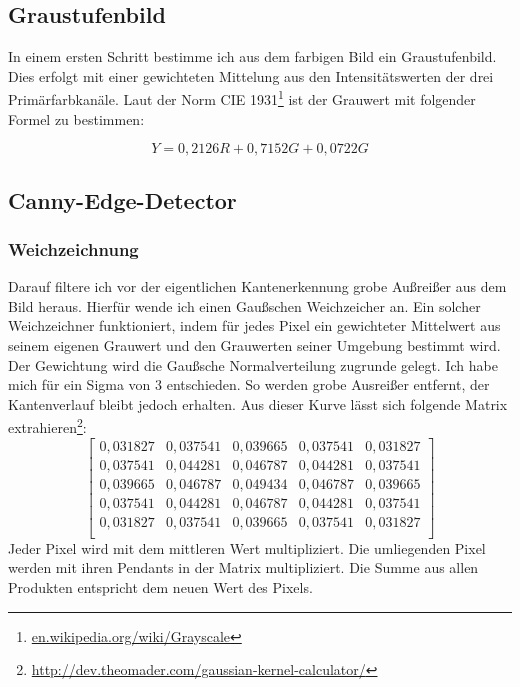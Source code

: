 \subsection{Graustufenbild}
In einem ersten Schritt bestimme ich aus dem farbigen Bild ein Graustufenbild. Dies erfolgt mit einer gewichteten Mittelung aus den Intensitätswerten der drei Primärfarbkanäle. Laut der Norm CIE 1931\footnote{\url{en.wikipedia.org/wiki/Grayscale}} ist der Grauwert mit folgender Formel zu bestimmen:

\begin{equation}
Y = 0,2126R+0,7152G+0,0722G
\end{equation}

\subsection{Canny-Edge-Detector}
\subsubsection{Weichzeichnung}
Darauf filtere ich vor der eigentlichen Kantenerkennung grobe Außreißer aus dem Bild heraus. Hierfür wende ich einen Gaußschen Weichzeicher an. Ein solcher Weichzeichner funktioniert, indem für jedes Pixel ein gewichteter Mittelwert aus seinem eigenen Grauwert und den Grauwerten seiner Umgebung bestimmt wird. Der Gewichtung wird die Gaußsche Normalverteilung zugrunde gelegt. Ich habe mich für ein Sigma von 3 entschieden. So werden grobe Ausreißer entfernt, der Kantenverlauf bleibt jedoch erhalten. Aus dieser Kurve lässt sich folgende Matrix extrahieren\footnote{\url{http://dev.theomader.com/gaussian-kernel-calculator/}}:
\begin{equation}
	\begin{bmatrix}
	0,031827&0,037541&0,039665&0,037541&0,031827 \\
	0,037541&0,044281&0,046787&0,044281&0,037541 \\
	0,039665&0,046787&0,049434&0,046787&0,039665 \\
	0,037541&0,044281&0,046787&0,044281&0,037541 \\
	0,031827&0,037541&0,039665&0,037541&0,031827 \\
	\end{bmatrix}
\end{equation}
Jeder Pixel wird mit dem mittleren Wert multipliziert. Die umliegenden Pixel werden mit ihren Pendants in der Matrix multipliziert. Die Summe aus allen Produkten entspricht dem neuen Wert des Pixels.

